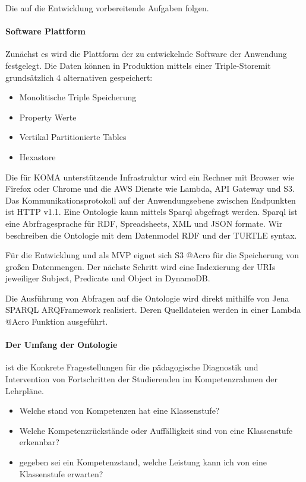 \documentclass[
12pt,
english,
ngerman,
headsepline,
twoside,
openright,
numbers=noenddot,version=first
]{scrreprt}
\begin{document}
Die auf die Entwicklung vorbereitende Aufgaben folgen.

\paragraph{Software Plattform} Zunächst es wird die Plattform der zu entwickelnde Software der Anwendung festgelegt.
Die Daten können in Produktion mittels einer \glqq Triple-Store\grqq mit grundsätzlich 4 alternativen gespeichert:
\begin{itemize}
	\item Monolitische Triple Speicherung
	\item Property Werte
	\item Vertikal Partitionierte Tables
	\item Hexastore
\end{itemize}

Die für KOMA unterstützende Infrastruktur wird ein Rechner mit Browser wie Firefox oder Chrome und die AWS Dienste wie Lambda, API Gateway und S3. Das Kommunikationsprotokoll auf der Anwendungsebene zwischen Endpunkten ist HTTP v1.1.
Eine Ontologie kann mittels Sparql abgefragt werden. Sparql ist eine Abrfragesprache für RDF, Spreadsheets, XML und JSON formate\cite{SparqlLearn}. Wir beschreiben die Ontologie mit dem Datenmodel RDF und der TURTLE syntax.

Für die Entwicklung und als MVP eignet sich S3 @Acro für die Speicherung von großen Datenmengen. Der nächste Schritt wird eine Indexierung der URIs jeweiliger Subject, Predicate und Object in DynamoDB. 

Die Ausführung von Abfragen auf die Ontologie wird direkt mithilfe von \glqq Jena SPARQL ARQ\grqq Framework realisiert. Deren Quelldateien werden in einer Lambda @Acro Funktion ausgeführt.

\paragraph{Der Umfang der Ontologie} ist die Konkrete Fragestellungen für die pädagogische Diagnostik und Intervention von Fortschritten der Studierenden im Kompetenzrahmen der Lehrpläne.

\begin{itemize}
	\item Welche stand von Kompetenzen hat eine Klassenstufe?
	\item Welche Kompetenzrückstände oder Auffälligkeit sind von eine Klassenstufe erkennbar?
	\item gegeben sei ein Kompetenzstand, welche Leistung kann ich von eine Klassenstufe erwarten?
\end{itemize}
\end{document}
